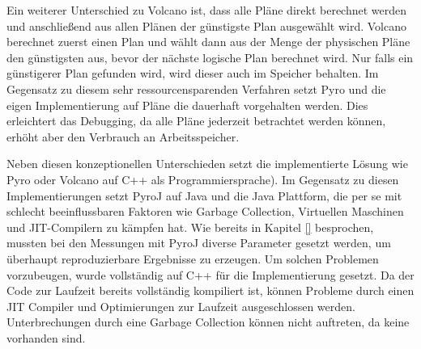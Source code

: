 Ein weiterer Unterschied zu Volcano ist, dass alle Pläne direkt berechnet werden und  anschließend aus allen Plänen der günstigste Plan ausgewählt wird. Volcano berechnet zuerst einen Plan und wählt dann aus der Menge der physischen Pläne den günstigsten aus, bevor der nächste logische Plan berechnet wird. Nur falls ein günstigerer Plan gefunden wird, wird dieser auch im Speicher behalten. Im Gegensatz zu diesem sehr ressourcensparenden Verfahren setzt Pyro und die eigen Implementierung auf Pläne die dauerhaft vorgehalten werden. Dies erleichtert das Debugging, da alle Pläne jederzeit betrachtet werden können, erhöht aber den Verbrauch an Arbeitsspeicher.

Neben diesen konzeptionellen Unterschieden setzt die implementierte Lösung wie Pyro oder Volcano auf C++ als Programmiersprache). Im Gegensatz zu diesen Implementierungen setzt PyroJ auf Java und die Java Plattform, die per se mit schlecht beeinflussbaren Faktoren wie Garbage Collection, Virtuellen Maschinen und JIT-Compilern zu kämpfen hat. Wie bereits in Kapitel \ref{} besprochen, mussten bei den Messungen mit PyroJ diverse Parameter gesetzt werden, um überhaupt reproduzierbare Ergebnisse zu erzeugen. Um solchen Problemen vorzubeugen, wurde vollständig auf C++ für die Implementierung gesetzt. Da der Code zur Laufzeit bereits vollständig kompiliert ist, können Probleme durch einen JIT Compiler und Optimierungen zur Laufzeit ausgeschlossen werden. Unterbrechungen durch eine Garbage Collection können nicht auftreten, da keine vorhanden sind.